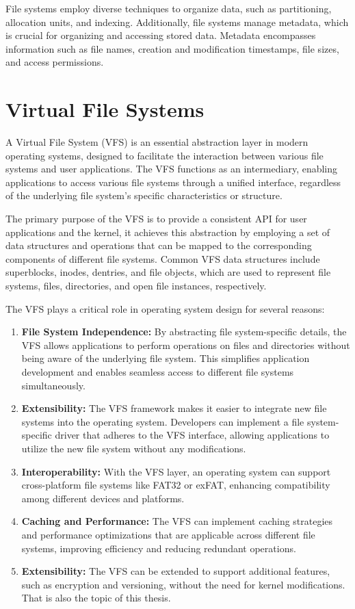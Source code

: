 File systems employ diverse techniques to organize data, such as partitioning, allocation units, and indexing.
Additionally, file systems manage metadata, which is crucial for organizing and accessing stored data.
Metadata encompasses information such as file names, creation and modification timestamps, file sizes, and access permissions.

\section{Virtual File Systems}\label{sec:virtual-file-systems}

A Virtual File System (VFS) is an essential abstraction layer in modern operating systems, designed to facilitate the interaction between various file systems and user applications.
The VFS functions as an intermediary, enabling applications to access various file systems through a unified interface, regardless of the underlying file system's specific characteristics or structure.

The primary purpose of the VFS is to provide a consistent API for user applications and the kernel, it achieves this abstraction by employing a set of data structures and operations that can be mapped to the corresponding components of different file systems.
Common VFS data structures include superblocks, inodes, dentries, and file objects, which are used to represent file systems, files, directories, and open file instances, respectively.

The VFS plays a critical role in operating system design for several reasons:

\begin{enumerate}
    \item \textbf{File System Independence:} By abstracting file system-specific details, the VFS allows applications to perform operations on files and directories without being aware of the underlying file system.
    This simplifies application development and enables seamless access to different file systems simultaneously.
    \item \textbf{Extensibility:} The VFS framework makes it easier to integrate new file systems into the operating system.
    Developers can implement a file system-specific driver that adheres to the VFS interface, allowing applications to utilize the new file system without any modifications.
    \item \textbf{Interoperability:} With the VFS layer, an operating system can support cross-platform file systems like FAT32 or exFAT, enhancing compatibility among different devices and platforms.
    \item \textbf{Caching and Performance:} The VFS can implement caching strategies and performance optimizations that are applicable across different file systems, improving efficiency and reducing redundant operations.
    \item \textbf{Extensibility:} The VFS can be extended to support additional features, such as encryption and versioning, without the need for kernel modifications.
    That is also the topic of this thesis.
\end{enumerate}

